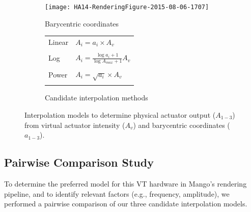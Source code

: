\begin{figure}[t] %
   \centering
  \begin{subfigure}[b]{0.4\textwidth}
	   \texttt{[image: HA14-RenderingFigure-2015-08-06-1707]} 
	   \caption{Barycentric coordinates}
	   \label{fig:rendering:algorithm:barycentric}
    \end{subfigure}
    \qquad
     \begin{subfigure}[b]{0.45\textwidth}
     		\begin{tabular}{l l}
	   	Linear & $A_i = a_i \times A_v$  \\ 
		\\
	   	Log & $A_i = \frac{\log{a_i+1}}{\log{A_{max} +1}}A_v$  \\
		\\
	   	Power & $A_i = \sqrt{a_i} \times A_v$
		\\
		\\
		\end{tabular}
	   \caption{Candidate interpolation methods}
	   \label{fig:rendering:algorithm:interpolation}
    \end{subfigure}
    	   \caption{Interpolation models to determine physical actuator output ($A_{1-3}$) from virtual actuator intensity ($A_v$) and barycentric coordinates ($a_{1-3}$).}
	   \label{fig:rendering:algorithm}
\end{figure}



%
%
%
\subsection{Pairwise Comparison Study}

To determine the preferred model for this VT hardware in Mango's rendering pipeline, and to identify relevant factors (e.g., frequency, amplitude), %
we performed a pairwise comparison of our three candidate interpolation models.

